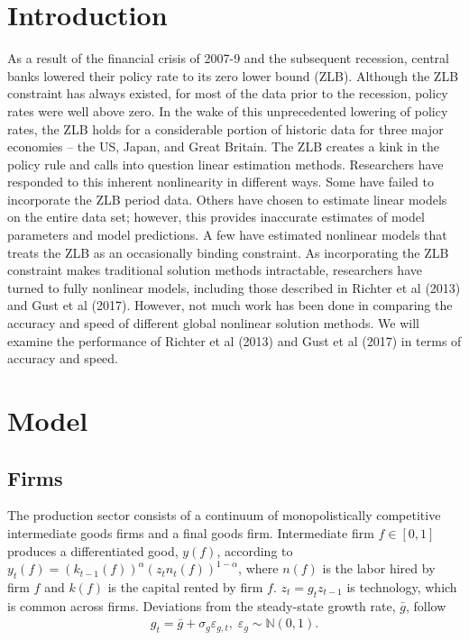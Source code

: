 \documentclass[12pt, final]{article}
\begin{document}
\section{Introduction}
As a result of the financial crisis of 2007-9 and the subsequent recession, central banks lowered their policy rate to its zero lower bound (ZLB). Although the ZLB constraint has always existed, for most of the data prior to the recession, policy rates were well above zero. In the wake of this unprecedented lowering of policy rates, the ZLB holds for a considerable portion of historic data for three major economies – the US, Japan, and Great Britain. The ZLB creates a kink in the policy rule and calls into question linear estimation methods. Researchers have responded to this inherent nonlinearity in different ways. Some have failed to incorporate the ZLB period data. Others have chosen to estimate linear models on the entire data set; however, this provides inaccurate estimates of model parameters and model predictions. A few have estimated nonlinear models that treats the ZLB as an occasionally binding constraint. As incorporating the ZLB constraint makes traditional solution methods intractable, researchers have turned to fully nonlinear models, including those described in Richter et al (2013) and Gust et al (2017). However, not much work has been done in comparing the accuracy and speed of different global nonlinear solution methods. We will examine the performance of Richter et al (2013) and Gust et al (2017) in terms of accuracy and speed. 

\section{Model}
\subsection{Firms} The production sector consists of a continuum of monopolistically competitive intermediate goods firms and a final goods firm. Intermediate firm $f \in [0,1]$ produces a differentiated good, $y(f)$, according to $y_t(f) = (k_{t-1}(f))^\alpha(z_tn_t(f))^{1-\alpha}$, where $n(f)$ is the labor hired by firm $f$ and $k(f)$ is the capital rented by firm $f$. $z_t = g_tz_{t-1}$ is technology, which is common across firms. Deviations from the steady-state growth rate, $\bar{g}$, follow
\begin{gather}
  \label{eq:1}
  g_t = \bar{g} + \sigma_g\varepsilon_{g,t},\; \varepsilon_g \sim \mathds{N}(0,1). 
\end{gather}
\end{document}
